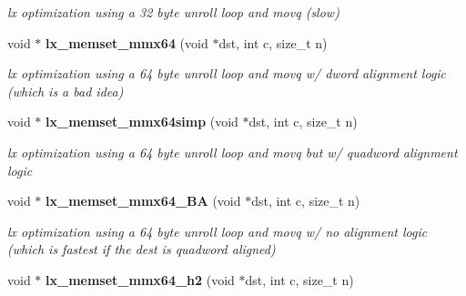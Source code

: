 \begin{CompactItemize}
\begin{CompactList}\small\item\em lx optimization using a 32 byte unroll loop and movq (slow)\item\end{CompactList}\item 
{}
void $\ast$ {\bf lx\_\-memset\_\-mmx64} (void $\ast$dst, int c, size\_\-t n)\label{memset_2def__test_8h_a10}

\begin{CompactList}\small\item\em lx optimization using a 64 byte unroll loop and movq w/ dword alignment logic (which is a bad idea)\item\end{CompactList}\item 
{}
void $\ast$ {\bf lx\_\-memset\_\-mmx64simp} (void $\ast$dst, int c, size\_\-t n)\label{memset_2def__test_8h_a11}

\begin{CompactList}\small\item\em lx optimization using a 64 byte unroll loop and movq but w/ quadword alignment logic\item\end{CompactList}\item 
{}
void $\ast$ {\bf lx\_\-memset\_\-mmx64\_\-BA} (void $\ast$dst, int c, size\_\-t n)\label{memset_2def__test_8h_a12}

\begin{CompactList}\small\item\em lx optimization using a 64 byte unroll loop and movq w/ no alignment logic (which is fastest if the dest is quadword aligned)\item\end{CompactList}\item 
void $\ast$ {\bf lx\_\-memset\_\-mmx64\_\-h2} (void $\ast$dst, int c, size\_\-t n)
\end{CompactItemize}



